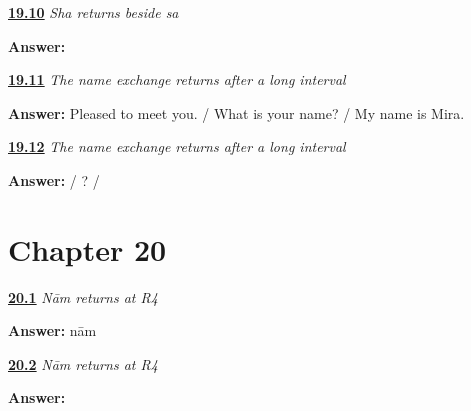 \noindent\begin{minipage}[t]{\linewidth}
\raggedright
\hyperlink{review-GU-R15-sha-r4-dictation}{\textbf{19.10}} \emph{Sha returns beside sa}\par
\small \textbf{Answer:}   \par
\end{minipage}\par\medskip

\noindent\begin{minipage}[t]{\linewidth}
\raggedright
\hyperlink{review-GU-R15-name-exchange-r3-reading}{\textbf{19.11}} \emph{The name exchange returns after a long interval}\par
\small \textbf{Answer:} Pleased to meet you. / What is your name? / My name is Mira.\par
\end{minipage}\par\medskip

\noindent\begin{minipage}[t]{\linewidth}
\raggedright
\hyperlink{review-GU-R15-name-exchange-r3-production}{\textbf{19.12}} \emph{The name exchange returns after a long interval}\par
\small \textbf{Answer:}     /    ? /    \par
\end{minipage}\par\medskip

\section*{Chapter 20}

\noindent\begin{minipage}[t]{\linewidth}
\raggedright
\hyperlink{review-GU-R16-naam-r4-listening}{\textbf{20.1}} \emph{Nām returns at R4}\par
\small \textbf{Answer:} nām\par
\end{minipage}\par\medskip

\noindent\begin{minipage}[t]{\linewidth}
\raggedright
\hyperlink{review-GU-R16-naam-r4-writing}{\textbf{20.2}} \emph{Nām returns at R4}\par
\small \textbf{Answer:} \par
\end{minipage}\par\medskip

